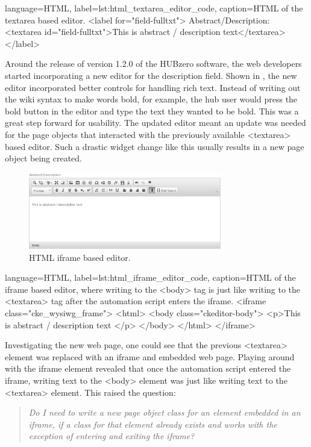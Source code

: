 \begin{xcode}{%
  language=HTML,%
  label=lst:html_textarea_editor_code,%
  caption={HTML of the textarea based editor.}%
}
<label for="field-fulltxt">
    Abstract/Description:
    <textarea id="field-fulltxt">This is abstract / description text</textarea>
</label>
\end{xcode}

Around the release of version 1.2.0 of the HUBzero software, the web developers
started incorporating a new editor for the description field. Shown in
, the new editor incorporated better
controls for handling rich text.  Instead of writing out the wiki syntax to
make words bold, for example, the hub user would press the bold button in the
editor and type the text they wanted to be bold.  This was a great step forward
for usability. The updated editor meant an update was needed for the page
objects that interacted with the previously available <textarea> based editor.
Such a drastic widget change like this usually results in a new page object
being created.



\begin{figure}[tbh]
  \centering
  \includegraphics[width=0.75\textwidth]
    {../../images/mygeohub_new_resource_compose_step_abstract_texteditor.png}
  \caption{HTML iframe based editor.}
  \label{fig:html_iframe_editor_widget}
\end{figure}

\begin{xcode}{%
  language=HTML,%
  label=lst:html_iframe_editor_code,%
  caption={HTML of the iframe based editor, where writing to the %
           <body> tag is just like writing to the %
           <textarea> tag after the automation script %
           enters the iframe.} %
}
<iframe class="cke_wysiwg_frame">
    <html>
        <body class="ckeditor-body">
            <p>This is abstract / description text </p>
        </body>
    </html>
</iframe>
\end{xcode}

Investigating the new web page, one could see that the previous <textarea>
element was replaced with an iframe and embedded web page. Playing around with
the iframe element revealed that once the automation script entered the iframe,
writing text to the <body> element was just like writing text to the <textarea>
element.  This raised the question: \begin{quote}\textit{Do I need to write a
new page object class for an element embedded in an iframe, if a class for that
element already exists and works with the exception of entering and exiting the
iframe?}\end{quote}



